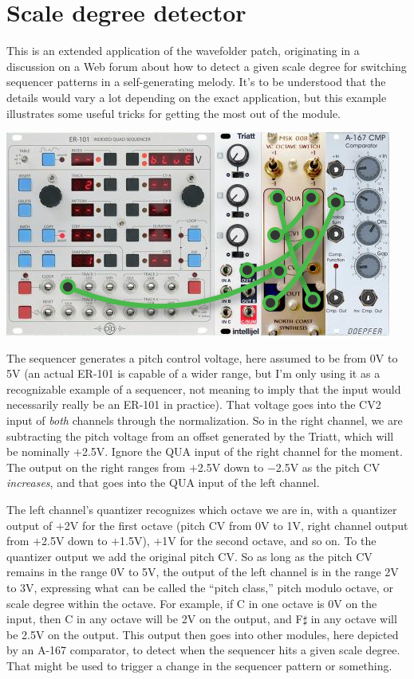\section{Scale degree detector}

This is an extended application of the wavefolder patch, originating in a
discussion on a Web forum about how to detect a given scale degree for
switching sequencer patterns in a self-generating melody.  It's to be
understood that the details would vary a lot depending on the exact
application, but this example illustrates some useful tricks for getting the
most out of the module.

\noindent
{\hspace*{\fill}\includegraphics[scale=0.5]{patch4.png}\hspace*{\fill}\par} 

The sequencer generates a pitch control voltage, here assumed to be from 0V
to 5V (an actual ER-101 is capable of a wider range, but I'm only using it
as a recognizable example of a sequencer, not meaning to imply that the
input would necessarily really be an ER-101 in practice).  That voltage goes
into the CV2 input of \emph{both} channels through the normalization.  So in
the right channel, we are subtracting the pitch voltage from an offset
generated by the Triatt, which will be nominally $+$2.5V.  Ignore the QUA
input of the right channel for the moment.  The output on the right ranges
from $+$2.5V down to $-$2.5V as the pitch CV \emph{increases}, and that goes
into the QUA input of the left channel.

The left channel's quantizer recognizes which octave we are in, with a
quantizer output of $+$2V for the first octave (pitch CV from 0V to 1V,
right channel output from $+$2.5V down to $+$1.5V), $+$1V for the second
octave, and so on.  To the quantizer output we add the original pitch CV. 
So as long as the pitch CV remains in the range 0V to 5V, the output of the
left channel is in the range 2V to 3V, expressing what can be called the
``pitch class,'' pitch modulo octave, or scale degree within the octave. 
For example, if C in one octave is 0V on the input, then C in any octave
will be 2V on the output, and F$\sharp$ in any octave will be 2.5V on the
output.  This output then goes into other modules, here depicted by an A-167
comparator, to detect when the sequencer hits a given scale degree.  That
might be used to trigger a change in the sequencer pattern or something.

